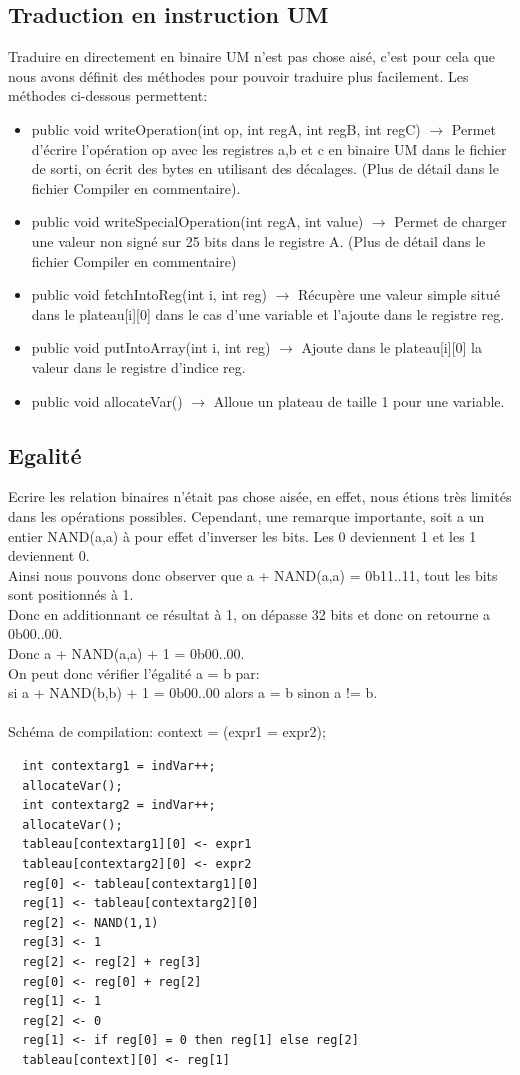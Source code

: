 \documentclass[a4paper,12pt]{report}
\begin{document}
\subsection{Traduction en instruction UM}
Traduire en directement en binaire UM n'est pas chose aisé, c'est pour cela que nous avons définit des méthodes pour pouvoir traduire
plus facilement.
Les méthodes ci-dessous permettent:
\begin{itemize}
 \item public void writeOperation(int op, int regA, int regB, int regC) $\rightarrow$ Permet d'écrire l'opération op avec les registres
 a,b et c en binaire UM dans le fichier de sorti, on écrit des bytes en utilisant des décalages. (Plus de détail dans le fichier Compiler
 en commentaire).
 \item public void writeSpecialOperation(int regA, int value) $\rightarrow$ Permet de charger une valeur non signé sur 25 bits dans 
 le registre A. (Plus de détail dans le fichier Compiler en commentaire)
 \item public void fetchIntoReg(int i, int reg) $\rightarrow$ Récupère une valeur simple situé dans le plateau[i][0] dans le cas d'une variable
 et l'ajoute dans le registre reg.
 \item public void putIntoArray(int i, int reg) $\rightarrow$ Ajoute dans le plateau[i][0] la valeur dans le registre d'indice reg.
 \item public void allocateVar() $\rightarrow$ Alloue un plateau de taille 1 pour une variable.
\end{itemize}

\subsection{Egalité}
Ecrire les relation binaires n'était pas chose aisée, en effet, nous étions très limités dans les opérations possibles.
Cependant, une remarque importante, soit a un entier NAND(a,a) à pour effet d'inverser les bits. Les 0 deviennent 1 et les 1 deviennent
0. \\
Ainsi nous pouvons donc observer que a + NAND(a,a) = 0b11..11, tout les bits sont positionnés à 1. \\
Donc en additionnant ce résultat à 1, on dépasse 32 bits et donc on retourne a 0b00..00. \\
Donc a + NAND(a,a) + 1 = 0b00..00. \\
On peut donc vérifier l'égalité a = b par: \\
si a + NAND(b,b) + 1 = 0b00..00 alors a = b sinon a != b.
\\ \\
Schéma de compilation: context = (expr1 = expr2);

\begin{verbatim}
  int contextarg1 = indVar++;
  allocateVar();
  int contextarg2 = indVar++;
  allocateVar();
  tableau[contextarg1][0] <- expr1
  tableau[contextarg2][0] <- expr2
  reg[0] <- tableau[contextarg1][0]
  reg[1] <- tableau[contextarg2][0]
  reg[2] <- NAND(1,1)
  reg[3] <- 1
  reg[2] <- reg[2] + reg[3]
  reg[0] <- reg[0] + reg[2]
  reg[1] <- 1
  reg[2] <- 0
  reg[1] <- if reg[0] = 0 then reg[1] else reg[2]
  tableau[context][0] <- reg[1]
\end{verbatim}
\end{document}
